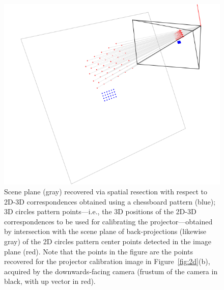 \documentclass[review]{elsarticle}
\begin{document}
\begin{figure}
    \centerline{\includegraphics[scale=.35]{images/2d3d.png}}
    \caption{Scene plane (gray) recovered via spatial resection with respect to 2D-3D correspondences obtained using a chessboard pattern (blue); 3D circles pattern points---i.e., the 3D positions of the
2D-3D correspondences to be used for calibrating the projector---obtained by intersection with the scene plane of back-projections (likewise gray) of the 2D circles pattern center points detected in the image plane (red). Note that the points in the figure are the points recovered for the projector calibration image in Figure~\ref{fig:2d}(b), acquired by the downwards-facing camera (frustum of the camera in black, with up vector in red).}
    \label{fig:3d}
\end{figure}
\end{document}

